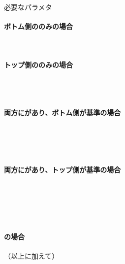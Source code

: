 \begin{Parameter}{必要なパラメタ}
\paragraph*{ボトム側の\Outcut のみの場合}
\PMBottomOutcutACWidth
\PMBottomOutcutBDWidth
\PMBottomOutcutConerR
\PMBottomOutcutLength\\
\PMBottomEndACID
\PMBottomOutcutAsideThickness
\PMPlatingThk
\tcbline*
\paragraph*{トップ側の\Outcut のみの場合}
\PMTopOutcutACWidth
\PMTopOutcutBDWidth
\PMTopOutcutCornerR\\
\PMTopOutcutLength
\PMKeywayPos
\PMKeywayWidth\\
\PMTopEndACID
\PMTopOutcutAsideThickness
\PMPlatingThk
\tcbline*
\paragraph*{両方に\Outcut があり、ボトム側が基準の場合}
\PMBottomOutcutACWidth
\PMBottomOutcutBDWidth
\PMBottomOutcutConerR
\PMBottomOutcutLength\\
\PMBottomEndACID
\PMBottomOutcutAsideThickness
\PMPlatingThk\\
\PMTopOutcutACWidth
\PMTopOutcutBDWidth
\PMTopOutcutCornerR
\PMTopOutcutLength\\
\PMKeywayPos
\PMKeywayWidth
\PMCenterlineEndFaceDifAC
\tcbline*
\paragraph*{両方に\Outcut があり、トップ側が基準の場合}
\PMTopOutcutACWidth
\PMTopOutcutBDWidth
\PMTopOutcutCornerR\\
\PMTopOutcutLength
\PMKeywayPos
\PMKeywayWidth\\
\PMTopEndACID
\PMTopOutcutAsideThickness
\PMPlatingThk\\
\PMBottomOutcutACWidth
\PMBottomOutcutBDWidth
\PMBottomOutcutConerR
\PMBottomOutcutLength\\
\PMCenterlineEndFaceDifAC
\tcbline*
\paragraph*{\CurvedOutcut の場合}
（以上に加えて）\PMCenterCurvatureRadius
\end{Parameter}

